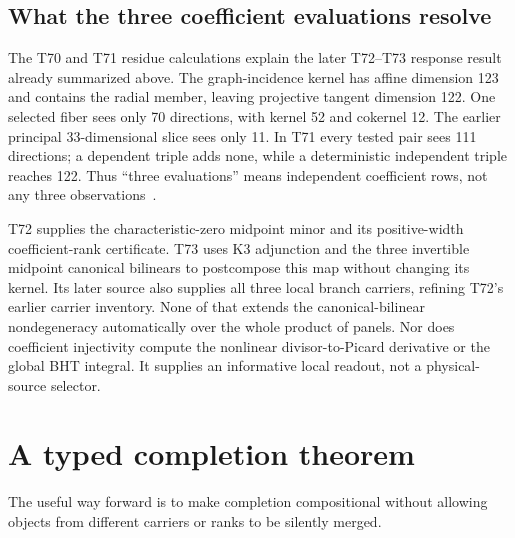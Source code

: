 \documentclass[11pt]{article}
\theoremstyle{definition}
\theoremstyle{remark}
\begin{document}
\subsection{What the three coefficient evaluations resolve}
\label{sec:response-import}

The T70 and T71 residue calculations explain the later T72--T73 response
result already summarized above. The graph-incidence kernel has affine
dimension 123 and contains the radial member, leaving projective tangent
dimension 122. One selected fiber sees only 70 directions, with kernel
52 and cokernel 12. The earlier principal 33-dimensional slice sees
only 11. In T71 every tested pair sees 111 directions; a dependent triple
adds none, while a deterministic independent triple reaches 122.
Thus ``three evaluations'' means independent coefficient rows, not any
three observations~\cite{FluxResponse}.

T72 supplies the characteristic-zero midpoint minor and its positive-width
coefficient-rank certificate. T73 uses K3 adjunction and the three
invertible midpoint canonical bilinears to postcompose this map without
changing its kernel. Its later source also supplies all three local
branch carriers, refining T72's earlier carrier inventory. None of that
extends the canonical-bilinear nondegeneracy automatically over the whole
product of panels. Nor does coefficient injectivity compute the
nonlinear divisor-to-Picard derivative or the global BHT integral.
It supplies an informative local readout, not a physical-source selector.

\section{A typed completion theorem}
\label{sec:contract}

The useful way forward is to make completion compositional without allowing
objects from different carriers or ranks to be silently merged.
\end{document}
